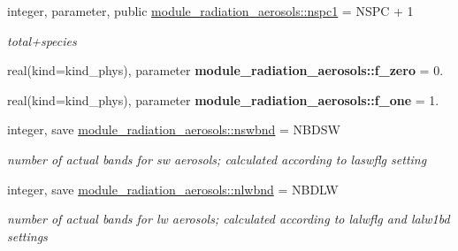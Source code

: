 \begin{DoxyCompactItemize}
\mbox{\label{group__module__radiation__aerosols_ga476c0181513603112dec3f4d2a2ec839}} 
integer, parameter, public \hyperlink{group__module__radiation__aerosols_ga476c0181513603112dec3f4d2a2ec839}{module\+\_\+radiation\+\_\+aerosols\+::nspc1} = N\+S\+PC + 1
\begin{DoxyCompactList}\small\item\em total+species \end{DoxyCompactList}\item 
\mbox{\label{group__module__radiation__aerosols_ga7db1adcf476a9a5532230aa11fcc3bb7}} 
real(kind=kind\+\_\+phys), parameter {\bfseries module\+\_\+radiation\+\_\+aerosols\+::f\+\_\+zero} = 0.
\item 
\mbox{\label{group__module__radiation__aerosols_ga63babe7f9ec4ff6a0364993f4be3768e}} 
real(kind=kind\+\_\+phys), parameter {\bfseries module\+\_\+radiation\+\_\+aerosols\+::f\+\_\+one} = 1.
\item 
\mbox{\label{group__module__radiation__aerosols_ga1d6c41e3bb818aa8b6f8f10d1c3f38a7}} 
integer, save \hyperlink{group__module__radiation__aerosols_ga1d6c41e3bb818aa8b6f8f10d1c3f38a7}{module\+\_\+radiation\+\_\+aerosols\+::nswbnd} = N\+B\+D\+SW
\begin{DoxyCompactList}\small\item\em number of actual bands for sw aerosols; calculated according to laswflg setting \end{DoxyCompactList}\item 
\mbox{\label{group__module__radiation__aerosols_gab17b7f75d6d737fd2fc81eae44cba81d}} 
integer, save \hyperlink{group__module__radiation__aerosols_gab17b7f75d6d737fd2fc81eae44cba81d}{module\+\_\+radiation\+\_\+aerosols\+::nlwbnd} = N\+B\+D\+LW
\begin{DoxyCompactList}\small\item\em number of actual bands for lw aerosols; calculated according to lalwflg and lalw1bd settings \end{DoxyCompactList}\item 
\mbox{\label{group__module__radiation__aerosols_gab77b3b4aa76361277d828c7ba5dc3eda}} 

\end{DoxyCompactItemize}
